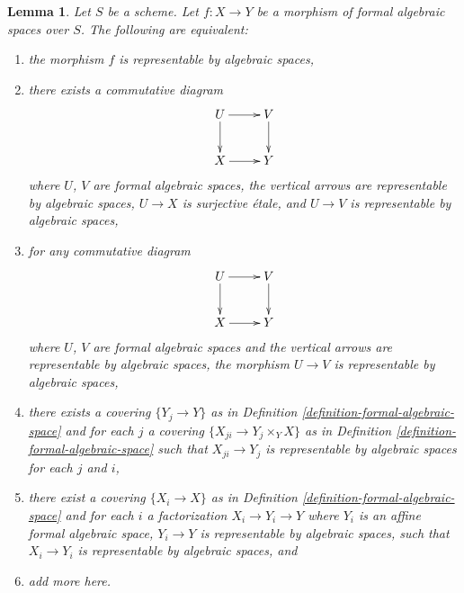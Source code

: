 \documentclass{stacks-project}
\theoremstyle{plain}
\newtheorem{lemma}[subsection]{Lemma}
\theoremstyle{definition}
\theoremstyle{remark}
\numberwithin{equation}{subsection}
\begin{document}
\begin{lemma}
\label{lemma-representable-by-algebraic-spaces-local}
Let $S$ be a scheme. Let $f : X \to Y$ be a morphism of formal algebraic
spaces over $S$. The following are equivalent:
\begin{enumerate}
\item the morphism $f$ is representable by algebraic spaces,
\item there exists a commutative diagram
$$
\xymatrix{
U \ar[d] \ar[r] & V \ar[d] \\
X \ar[r] & Y
}
$$
where $U$, $V$ are formal algebraic spaces, the vertical arrows are
representable by algebraic spaces, $U \to X$
is surjective \'etale, and $U \to V$ is representable by algebraic spaces,
\item for any commutative diagram
$$
\xymatrix{
U \ar[d] \ar[r] & V \ar[d] \\
X \ar[r] & Y
}
$$
where $U$, $V$ are formal algebraic spaces and the vertical arrows are
representable by algebraic spaces, the morphism $U \to V$ is
representable by algebraic spaces,
\item there exists a covering $\{Y_j \to Y\}$ as in
Definition \ref{definition-formal-algebraic-space}
and for each $j$ a covering $\{X_{ji} \to Y_j \times_Y X\}$ as in
Definition \ref{definition-formal-algebraic-space} such that
$X_{ji} \to Y_j$ is representable by algebraic spaces for each $j$ and $i$,
\item there exist a covering $\{X_i \to X\}$ as in
Definition \ref{definition-formal-algebraic-space}
and for each $i$ a factorization $X_i \to Y_i \to Y$ where $Y_i$
is an affine formal algebraic space, $Y_i \to Y$ is representable
by algebraic spaces, such that $X_i \to Y_i$ is representable by algebraic
spaces, and
\item add more here.
\end{enumerate}
\end{lemma}
\end{document}
